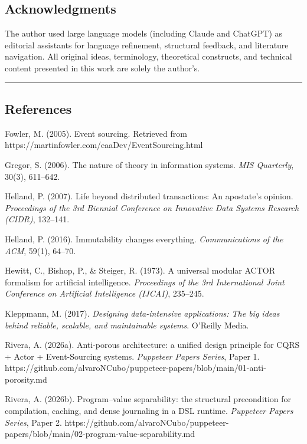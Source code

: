\documentclass[
]{article}
\begin{document}
\subsection{Acknowledgments}\label{acknowledgments}

The author used large language models (including Claude and ChatGPT) as
editorial assistants for language refinement, structural feedback, and
literature navigation. All original ideas, terminology, theoretical
constructs, and technical content presented in this work are solely the
author's.

\begin{center}\rule{0.5\linewidth}{0.5pt}\end{center}

\subsection{References}\label{references}

Fowler, M. (2005). Event sourcing. Retrieved from
https://martinfowler.com/eaaDev/EventSourcing.html

Gregor, S. (2006). The nature of theory in information systems.
\emph{MIS Quarterly}, 30(3), 611--642.

Helland, P. (2007). Life beyond distributed transactions: An apostate's
opinion. \emph{Proceedings of the 3rd Biennial Conference on Innovative
Data Systems Research (CIDR)}, 132--141.

Helland, P. (2016). Immutability changes everything.
\emph{Communications of the ACM}, 59(1), 64--70.

Hewitt, C., Bishop, P., \& Steiger, R. (1973). A universal modular ACTOR
formalism for artificial intelligence. \emph{Proceedings of the 3rd
International Joint Conference on Artificial Intelligence (IJCAI)},
235--245.

Kleppmann, M. (2017). \emph{Designing data-intensive applications: The
big ideas behind reliable, scalable, and maintainable systems}. O'Reilly
Media.

Rivera, A. (2026a). Anti-porous architecture: a unified design principle
for CQRS + Actor + Event-Sourcing systems. \emph{Puppeteer Papers
Series}, Paper 1.
https://github.com/alvaroNCubo/puppeteer-papers/blob/main/01-anti-porosity.md

Rivera, A. (2026b). Program--value separability: the structural
precondition for compilation, caching, and dense journaling in a DSL
runtime. \emph{Puppeteer Papers Series}, Paper 2.
https://github.com/alvaroNCubo/puppeteer-papers/blob/main/02-program-value-separability.md
\end{document}
